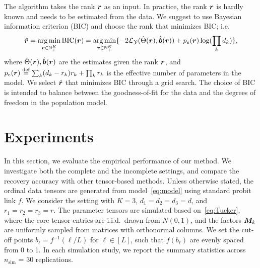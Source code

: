 \documentclass{article}
\theoremstyle{plain}
\theoremstyle{definition}
\begin{document}
The algorithm takes the rank $\bm{r}$ as an input. In practice, the rank $\bm{r}$ is hardly known and needs to be estimated from the data. We suggest to use Bayesian information criterion (BIC) and choose the rank that minimizes BIC; i.e.
\begin{align}\label{eq:BIC}
\hat {\bm{r}}=\operatorname*{arg\,min}_{\bm{r}\in\mathbb{N}^K_{+}} \text{BIC}(\bm{r})
=\operatorname*{arg\,min}_{\bm{r}\in\mathbb{N}^K_{+}}\{-2\mathcal{L}_{\mathcal{Y}}(\hat \Theta(\bm{r}),\hat {\bm{b}}(\bm{r}))+p_e(\bm{r})\log (\prod_k d_k)\},
\end{align}
where $\hat \Theta(\bm{r}), \hat{\bm{b}}(\bm{r})$ are the estimates given the rank $\bm{r}$, and $p_e(\bm{r})\stackrel{\text{def}}{=}\sum_k (d_k-r_k)r_k+\prod_k r_k$ is the effective number of parameters in the model. We select $\hat {\bm{r}}$ that minimizes BIC through a grid search. The choice of BIC is intended to balance between the goodness-of-fit for the data and the degrees of freedom in the population model.

\vspace{-.3cm}
\section{Experiments}\label{sec:experiment}
\vspace{-.2cm}
In this section, we evaluate the empirical performance of our method. We investigate both the complete and the incomplete settings, and compare the recovery accuracy with other tensor-based methods. Unless otherwise stated, the ordinal data tensors are generated from model~\eqref{eq:model} using standard probit link $f$. We consider the setting with $K=3$, $d_1=d_2=d_3=d$, and $r_1=r_2=r_3=r$. The parameter tensors are simulated based on~\eqref{eq:Tucker}, where the core tensor entries are i.i.d.\ drawn from $N(0,1)$, and the factors $\bm M_k$ are uniformly sampled from matrices with orthonormal columns. We set the cut-off points $b_\ell=f^{-1}(\ell/L)$ for $\ell\in[L]$, such that $f(b_\ell)$ are evenly spaced from 0 to 1. In each simulation study, we report the summary statistics across $n_{\text{sim}}$ = 30 replications.

\vspace{-.3cm}
\end{document}
